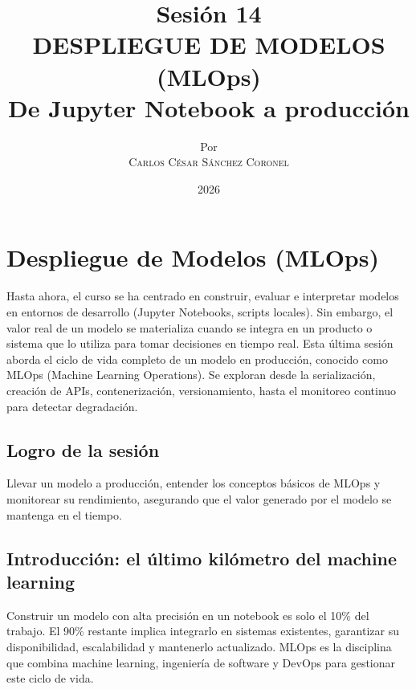 \documentclass[12pt,a4paper,openany,oneside]{book}
\title{
    \textbf{Sesión 14} \\ 
    \Huge \textbf{DESPLIEGUE DE MODELOS (MLOps)} \\
    \Large De Jupyter Notebook a producción
}
\author{
    \small Por \\ \vspace{0.2cm}
    \Large \textsc{Carlos César Sánchez Coronel}
}
\date{2026}
\begin{document}
\maketitle
\tableofcontents
{}

\chapter{Despliegue de Modelos (MLOps)}

Hasta ahora, el curso se ha centrado en construir, evaluar e interpretar modelos en entornos de desarrollo (Jupyter Notebooks, scripts locales). Sin embargo, el valor real de un modelo se materializa cuando se integra en un producto o sistema que lo utiliza para tomar decisiones en tiempo real. Esta última sesión aborda el ciclo de vida completo de un modelo en producción, conocido como MLOps (Machine Learning Operations). Se exploran desde la serialización, creación de APIs, contenerización, versionamiento, hasta el monitoreo continuo para detectar degradación.

\section{Logro de la sesión}
Llevar un modelo a producción, entender los conceptos básicos de MLOps y monitorear su rendimiento, asegurando que el valor generado por el modelo se mantenga en el tiempo.

\section{Introducción: el último kilómetro del machine learning}

Construir un modelo con alta precisión en un notebook es solo el 10\% del trabajo. El 90\% restante implica integrarlo en sistemas existentes, garantizar su disponibilidad, escalabilidad y mantenerlo actualizado. MLOps es la disciplina que combina machine learning, ingeniería de software y DevOps para gestionar este ciclo de vida.

\begin{center}
\caption{Ciclo de vida MLOps.}
\end{center}
\end{document}
